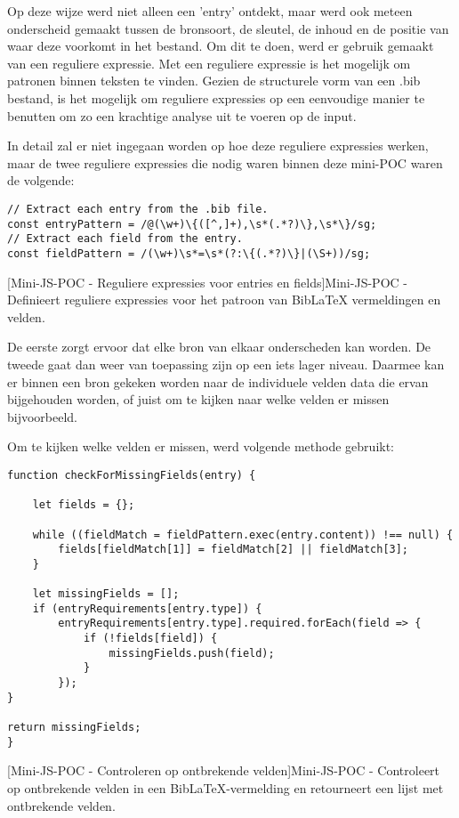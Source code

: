 Op deze wijze werd niet alleen een 'entry' ontdekt, maar werd ook meteen onderscheid gemaakt tussen de bronsoort, de sleutel, de inhoud en de positie van waar deze voorkomt in het bestand. Om dit te doen, werd er gebruik gemaakt van een reguliere expressie. Met een reguliere expressie is het mogelijk om patronen binnen teksten te vinden. Gezien de structurele vorm van een .bib bestand, is het mogelijk om reguliere expressies op een eenvoudige manier te benutten om zo een krachtige analyse uit te voeren op de input.

In detail zal er niet ingegaan worden op hoe deze reguliere expressies werken, maar de twee reguliere expressies die nodig waren binnen deze mini-\acrshort{POC} waren de volgende:
\begin{verbatim}
// Extract each entry from the .bib file.
const entryPattern = /@(\w+)\{([^,]+),\s*(.*?)\},\s*\}/sg;
// Extract each field from the entry.
const fieldPattern = /(\w+)\s*=\s*(?:\{(.*?)\}|(\S+))/sg;
\end{verbatim}
[Mini-\acrshort{JS}-\acrshort{POC} - Reguliere expressies voor entries en fields]{Mini-\acrshort{JS}-\acrshort{POC} - Definieert reguliere expressies voor het patroon van BibLaTeX vermeldingen en velden. \label{lst:minipocjs_regex_patterns}}

De eerste zorgt ervoor dat elke bron van elkaar onderscheden kan worden. De tweede gaat dan weer van toepassing zijn op een iets lager niveau. Daarmee kan er binnen een bron gekeken worden naar de individuele velden data die ervan bijgehouden worden, of juist om te kijken naar welke velden er missen bijvoorbeeld.

Om te kijken welke velden er missen, werd volgende methode gebruikt:

\begin{verbatim}
function checkForMissingFields(entry) {

    let fields = {};

    while ((fieldMatch = fieldPattern.exec(entry.content)) !== null) {
        fields[fieldMatch[1]] = fieldMatch[2] || fieldMatch[3];
    }

    let missingFields = [];
    if (entryRequirements[entry.type]) {
        entryRequirements[entry.type].required.forEach(field => {
            if (!fields[field]) {
                missingFields.push(field);
            }
        });
}

return missingFields;
}
\end{verbatim}
[Mini-\acrshort{JS}-\acrshort{POC} - Controleren op ontbrekende velden]{Mini-\acrshort{JS}-\acrshort{POC} - Controleert op ontbrekende velden in een BibLaTeX-vermelding en retourneert een lijst met ontbrekende velden. \label{lst:minipocjs_check_missing_fields}}


